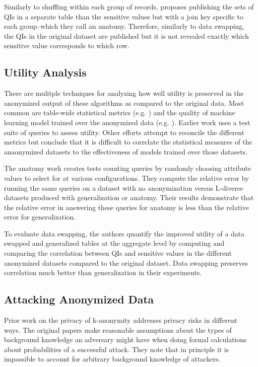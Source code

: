 Similarly to shuffling within each group of records, \cite{xiaoAnatomy} proposes publishing the sets of QIs in a separate table than the sensitive values but with a join key specific to each group--which they call an anatomy. Therefore, similarly to data swapping\cite{soriaSwapping}, the QIs in the original dataset are published but it is not revealed exactly which sensitive value corresponds to which row.

\subsection{Utility Analysis}
There are mulitple techniques for analyzing how well utility is preserved in the anonymized output of these algorithms as compared to the original data. Most common are table-wide statistical metrics (e.g. \cite{soriaSwapping}) and the quality of machine learning model trained over the anonymized data (e.g. \cite{sangogboyePad}). Earlier work\cite{xiaoAnatomy} uses a test suite of queries to assess utility. Other efforts attempt to reconcile the different metrics but conclude that it is difficult to correlate the statistical measures of the anaonymized datasets to the effectiveness of models trained over those datasets\cite{vsarvcevicEffectiveness}.

The anatomy work\cite{xiaoAnatomy} creates tests counting queries by randomly choosing attribute values to select for at various configurations. They compute the relative error by running the same queries on a dataset with no anonymization versus L-diverse datasets produced with generalization or anatomy. Their results demonstrate that the relative error in answering these queries for anatomy is less than the relative error for generalization.

To evaluate data swapping\cite{soriaSwapping}, the authors quantify the improved utility of a data swapped and generalized tables at the aggregate level by computing and comparing the correlation between QIs and sensitive values in the different anonymized datasets compared to the original dataset. Data swapping preserves correlation much better than generalization in their experiments.

\subsection{Attacking Anonymized Data}
Prior work on the privacy of k-anonymity addresses privacy risks in different ways. The original papers make reasonable assumptions about the types of background knowledge an adversary might have when doing formal calculations about probabilities of a successful attack. They note that in principle it is impossible to account for arbitrary background knowledge of attackers.

